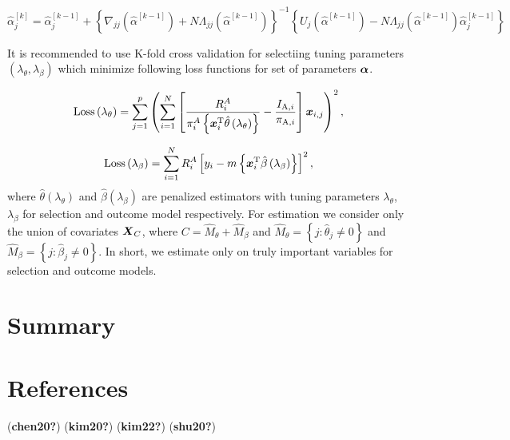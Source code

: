 \documentclass[
  letterpaper,
  DIV=11,
  numbers=noendperiod]{scrreprt}
\newlength{\cslhangindent}
\newenvironment{CSLReferences}[2] %
 {\begin{list}{}{%
  \setlength{\itemindent}{0pt}
  \setlength{\leftmargin}{0pt}
  \setlength{\parsep}{0pt}
  \ifodd #1
   \setlength{\leftmargin}{\cslhangindent}
   \setlength{\itemindent}{-1\cslhangindent}
  \fi
  \setlength{\itemsep}{#2\baselineskip}}}
 {\end{list}}
\begin{document}
\[
\hat{\alpha}_j^{[k]}=\hat{\alpha}_j^{[k-1]}+\left\{\nabla_{j j}\left(\hat{\alpha}^{[k-1]}\right)+N \Lambda_{j j}\left(\hat{\alpha}^{[k-1]}\right)\right\}^{-1}\left\{U_j\left(\hat{\alpha}^{[k-1]}\right)-N \Lambda_{j j}\left(\hat{\alpha}^{[k-1]}\right) \hat{\alpha}_j^{[k-1]}\right\}
\]

It is recommended to use K-fold cross validation for selectiing tuning
parameters \(\left(\lambda_{\theta}, \lambda_{\beta}\right)\) which
minimize following loss functions for set of parameters \(\boldsymbol{\alpha}\).

\[
\operatorname{Loss}\left(\lambda_\theta\right)=\sum_{j=1}^p\left(\sum_{i=1}^N\left[\frac{R_i^A}{\pi_i^A\left\{\boldsymbol{x}_i^{\mathrm{T}} \hat{\theta}\left(\lambda_\theta\right)\right\}}-\frac{I_{\mathrm{A}, i}}{\pi_{\mathrm{A}, i}}\right] \boldsymbol{x}_{i, j}\right)^2,
\]

\[
\operatorname{Loss}\left(\lambda_\beta\right)=\sum_{i=1}^N R_i^A\left[y_i-m\left\{\boldsymbol{x}_i^{\mathrm{T}} \hat{\beta}\left(\lambda_\beta\right)\right\}\right]^2,
\] where \(\hat{\theta}\left(\lambda_\theta\right)\) and
\(\hat{\beta}\left(\lambda_\beta\right)\) are penalized estimators with
tuning parameters \(\lambda_\theta\), \(\lambda_\beta\) for selection
and outcome model respectively. For estimation we consider only the
union of covariates \(\boldsymbol{X}_C\), where
\(C = \hat{M}_{\theta} + \hat{M}_{\beta}\) and
\(\hat{M}_{\theta} = \left\{j: \hat{\theta}_j \ne 0\right\}\) and
\(\hat{M}_{\beta} = \left\{j: \hat{\beta}_j \ne 0\right\}\). In short,
we estimate only on truly important variables for selection and outcome
models.


\chapter{Summary}\label{summary}


\chapter{References}\label{references}

\label{refs}
\begin{CSLReferences}{0}{1}
\end{CSLReferences}

(\textbf{chen20?}) (\textbf{kim20?}) (\textbf{kim22?}) (\textbf{shu20?})

\cleardoublepage
{}
{}
\appendix
\end{document}
